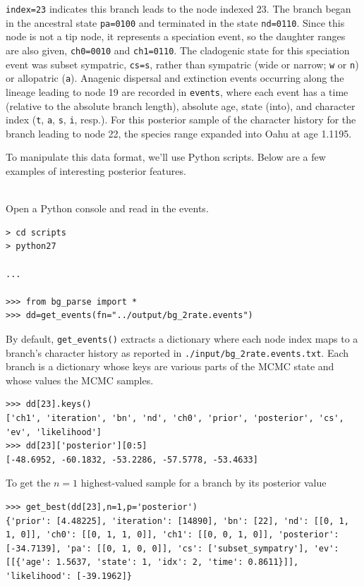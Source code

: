 {\tt index=23} indicates this branch leads to the node indexed 23.
The branch began in the ancestral state {\tt pa=0100} and terminated in the state {\tt nd=0110}.
Since this node is not a tip node, it represents a speciation event, so the daughter ranges are also given, {\tt ch0=0010} and {\tt ch1=0110}.
The cladogenic state for this speciation event was subset sympatric, {\tt cs=s}, rather than sympatric (wide or narrow; {\tt w} or  {\tt n}) or allopatric ({\tt a}).
Anagenic dispersal and extinction events occurring along the lineage leading to node 19 are recorded in {\tt events}, where each event has a time (relative to the absolute branch length), absolute age, state (into), and character index ({\tt t}, {\tt a}, {\tt s}, {\tt i}, resp.).
For this posterior sample of the character history for the branch leading to node 22, the species range expanded into Oahu at age 1.1195.

To manipulate this data format, we'll use Python scripts. Below are a few examples of interesting posterior features.

\noindent \\ \impmark  Open a Python console and read in the events.

\begin{snugshade}
\begin{lstlisting}
> cd scripts
> python27

...

>>> from bg_parse import *
>>> dd=get_events(fn="../output/bg_2rate.events")
\end{lstlisting}
\end{snugshade}

By default, {\tt get\_events()} extracts a dictionary where each node index maps to a branch's character history as reported in {\tt ./input/bg\_2rate.events.txt}. 
Each branch is a dictionary whose keys are various parts of the MCMC state and whose values the MCMC samples.
\begin{snugshade}
\begin{lstlisting}
>>> dd[23].keys()
['ch1', 'iteration', 'bn', 'nd', 'ch0', 'prior', 'posterior', 'cs', 'ev', 'likelihood']
>>> dd[23]['posterior'][0:5]
[-48.6952, -60.1832, -53.2286, -57.5778, -53.4633]
\end{lstlisting}
\end{snugshade}

To get the $n=1$ highest-valued sample for a branch by its posterior value
\begin{snugshade}
\begin{lstlisting}
>>> get_best(dd[23],n=1,p='posterior')
{'prior': [4.48225], 'iteration': [14890], 'bn': [22], 'nd': [[0, 1, 1, 0]], 'ch0': [[0, 1, 1, 0]], 'ch1': [[0, 0, 1, 0]], 'posterior': [-34.7139], 'pa': [[0, 1, 0, 0]], 'cs': ['subset_sympatry'], 'ev': [[{'age': 1.5637, 'state': 1, 'idx': 2, 'time': 0.8611}]], 'likelihood': [-39.1962]}
\end{lstlisting}
\end{snugshade}

